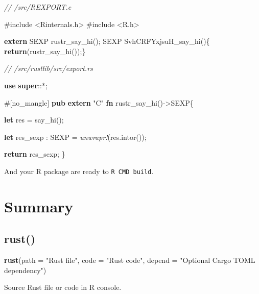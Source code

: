 \documentclass[]{book}
\newenvironment{Shaded}{\begin{snugshade}}{\end{snugshade}}
\newcommand{\KeywordTok}[1]{\textcolor[rgb]{0.13,0.29,0.53}{\textbf{{#1}}}}
\newcommand{\DataTypeTok}[1]{\textcolor[rgb]{0.13,0.29,0.53}{{#1}}}
\newcommand{\StringTok}[1]{\textcolor[rgb]{0.31,0.60,0.02}{{#1}}}
\newcommand{\CommentTok}[1]{\textcolor[rgb]{0.56,0.35,0.01}{\textit{{#1}}}}
\newcommand{\OtherTok}[1]{\textcolor[rgb]{0.56,0.35,0.01}{{#1}}}
\newcommand{\PreprocessorTok}[1]{\textcolor[rgb]{0.56,0.35,0.01}{\textit{{#1}}}}
\newcommand{\AttributeTok}[1]{\textcolor[rgb]{0.77,0.63,0.00}{{#1}}}
\newcommand{\NormalTok}[1]{{#1}}
\begin{document}
\begin{Shaded}
\begin{Highlighting}[]
\CommentTok{// /src/REXPORT.c}

\OtherTok{#include <Rinternals.h>}
\OtherTok{#include <R.h>}

\KeywordTok{extern} \NormalTok{SEXP rustr_say_hi();}
\NormalTok{SEXP SvhCRFYxjsuH_say_hi()\{ }\KeywordTok{return}\NormalTok{(rustr_say_hi());\}}
\end{Highlighting}
\end{Shaded}

\begin{Shaded}
\begin{Highlighting}[]
\CommentTok{// /src/rustlib/src/export.rs}

\KeywordTok{use} \KeywordTok{super}\NormalTok{::*;}

\AttributeTok{#[}\NormalTok{no_mangle}\AttributeTok{]}
\KeywordTok{pub} \KeywordTok{extern} \StringTok{"C"} \KeywordTok{fn} \NormalTok{rustr_say_hi()->SEXP\{}

 \KeywordTok{let} \NormalTok{res  = say_hi();}

 \KeywordTok{let} \NormalTok{res_sexp : SEXP = }\PreprocessorTok{unwrapr!}\NormalTok{(res.intor());}

 \KeywordTok{return} \NormalTok{res_sexp;}
\NormalTok{\}}
\end{Highlighting}
\end{Shaded}

And your R package are ready to \texttt{R\ CMD\ build}.

\section{Summary}\label{summary}

\subsection{rust()}\label{rust}

\begin{Shaded}
\begin{Highlighting}[]
\KeywordTok{rust}\NormalTok{(}\DataTypeTok{path =} \StringTok{"Rust file"}\NormalTok{, }\DataTypeTok{code =} \StringTok{"Rust code"}\NormalTok{, }\DataTypeTok{depend =} \StringTok{"Optional Cargo TOML dependency"}\NormalTok{)}
\end{Highlighting}
\end{Shaded}

Source Rust file or code in R console.
\end{document}
